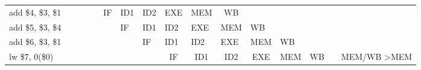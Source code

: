 \documentclass[pdftex,12pt,a4paper]{report}
\begin{document}
\begin{table}[!htb]
{\begin{tabular}{llllllllccclllllll}
add \$4, \$3, \$1                   &                         &                          &                          & \multicolumn{1}{l|}{}    & \multicolumn{1}{c|}{IF}  & \multicolumn{1}{c|}{ID1}                         & \multicolumn{1}{c|}{ID2}                         & \multicolumn{1}{c|}{\cellcolor[HTML]{9AFF99}EXE} & \multicolumn{1}{c|}{\cellcolor[HTML]{FFFE65}MEM} & \multicolumn{1}{c|}{WB}  &                          &                                                  &                                                  &                                                  &                          &                          &                         \\ \cline{6-12}
add \$5, \$3, \$4                   &                         &                          &                          &                          & \multicolumn{1}{l|}{}    & \multicolumn{1}{l|}{IF}                          & \multicolumn{1}{l|}{ID1}                         & \multicolumn{1}{l|}{ID2}                         & \multicolumn{1}{l|}{\cellcolor[HTML]{FFFE65}EXE} & \multicolumn{1}{l|}{MEM} & \multicolumn{1}{l|}{WB}  &                                                  &                                                  &                                                  &                          &                          &                         \\ \cline{7-13}
add \$6, \$3, \$1                   &                         &                          &                          &                          &                          & \multicolumn{1}{l|}{}                            & \multicolumn{1}{l|}{IF}                          & \multicolumn{1}{l|}{ID1}                         & \multicolumn{1}{l|}{\cellcolor[HTML]{FCFF2F}ID2} & \multicolumn{1}{l|}{EXE} & \multicolumn{1}{l|}{MEM} & \multicolumn{1}{l|}{WB}                          &                                                  &                                                  &                          &                          &                         \\ \cline{8-14}
lw \$7, 0(\$0)                      &                         &                          &                          &                          &                          &                                                  & \multicolumn{1}{l|}{}                            & \multicolumn{1}{c|}{IF}                          & \multicolumn{1}{c|}{ID1}                         & \multicolumn{1}{c|}{ID2} & \multicolumn{1}{c|}{EXE} & \multicolumn{1}{c|}{\cellcolor[HTML]{F8A102}MEM} & \multicolumn{1}{c|}{\cellcolor[HTML]{FFCC67}WB}  &                                                  & \multicolumn{3}{l}{MEM/WB \textgreater MEM}                                   \\ \cline{9-15}

\end{tabular}}
\end{table}
\end{document}
